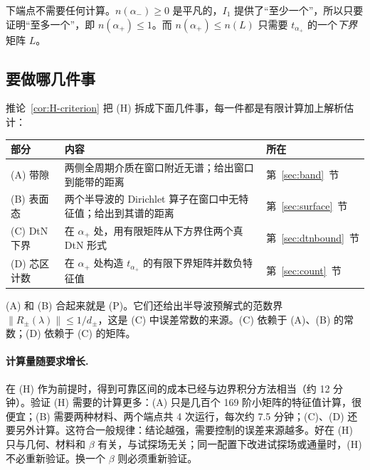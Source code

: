 \documentclass[11pt,a4paper,fontset=fandol]{ctexart}
\begin{document}
\begin{keypoint}
下端点不需要任何计算。$n(\alpha_-)\ge0$ 是平凡的，$I_1$ 提供了“至少一个”，所以只要证明“至多一个”，即 $n(\alpha_+)\le1$。而 $n(\alpha_+)\le n(L)$ 只需要 $t_{\alpha_+}$ 的一个\emph{下界}矩阵 $L$。
\end{keypoint}

\subsection{要做哪几件事}

推论~\ref{cor:H-criterion} 把 (H) 拆成下面几件事，每一件都是有限计算加上解析估计：

\begin{center}
\small
\begin{tabular}{>{\raggedright\arraybackslash}p{3.2cm}>{\raggedright\arraybackslash}p{6.6cm}>{\raggedright\arraybackslash}p{3.6cm}}
\toprule
部分 & 内容 & 所在 \\
\midrule
(A) 带隙 & 两侧全周期介质在窗口附近无谱；给出窗口到能带的距离 & 第~\ref{sec:band}~节 \\
(B) 表面态 & 两个半导波的 Dirichlet 算子在窗口中无特征值；给出到其谱的距离 & 第~\ref{sec:surface}~节 \\
(C) DtN 下界 & 在 $\alpha_+$ 处，用有限矩阵从下方界住两个真 DtN 形式 & 第~\ref{sec:dtnbound}~节 \\
(D) 芯区计数 & 在 $\alpha_+$ 处构造 $t_{\alpha_+}$ 的有限下界矩阵并数负特征值 & 第~\ref{sec:count}~节 \\
\bottomrule
\end{tabular}
\end{center}

(A) 和 (B) 合起来就是 (P)。它们还给出半导波预解式的范数界 $\|R_\pm(\lambda)\|\le1/d_\pm$，这是 (C) 中误差常数的来源。(C) 依赖于 (A)、(B) 的常数；(D) 依赖于 (C) 的矩阵。

\paragraph{计算量随要求增长.} 在 (H) 作为前提时，得到可靠区间的成本已经与边界积分方法相当（约 12 分钟）。验证 (H) 需要的计算更多：(A) 只是几百个 169 阶小矩阵的特征值计算，很便宜；(B) 需要两种材料、两个端点共 4 次运行，每次约 7.5 分钟；(C)、(D) 还要另外计算。这符合一般规律：结论越强，需要控制的误差来源越多。好在 (H) 只与几何、材料和 $\beta$ 有关，与试探场无关；同一配置下改进试探场或通量时，(H) 不必重新验证。换一个 $\beta$ 则必须重新验证。

\end{document}

